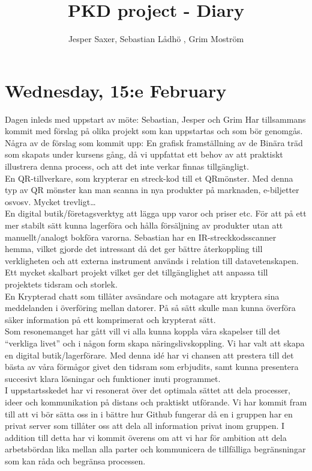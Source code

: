 \documentclass[11pt]{article}
\begin{document}
\title{PKD project - Diary}
\author{Jesper Saxer, Sebastian Lådhö , Grim Moström}
\date{}
\maketitle
\section*{Wednesday, 15:e February}
Dagen inleds med uppstart av möte: Sebastian, Jesper och Grim Har tillsammans kommit med förslag på olika projekt som kan uppstartas och som bör genomgås.
Några av de förslag som kommit upp:
En grafisk framställning av de Binära träd som skapats under kursens gång, då vi uppfattat ett behov av att praktiskt illustrera denna process, och att det inte verkar finnas tillgängligt.\\

En QR-tillverkare, som krypterar en streck-kod till et QRmönster. Med denna typ av QR mönster kan man scanna in nya produkter på marknaden, e-biljetter osvosv. Mycket trevligt…\\

En digital butik/företagsverktyg att lägga upp varor och priser etc. För att på ett mer stabilt sätt kunna lagerföra och hålla försäljning av produkter utan att manuellt/analogt bokföra varorna. Sebastian har en IR-streckkodsscanner hemma, vilket gjorde det intressant då det ger bättre återkoppling till verkligheten och att externa instrument används i relation till datavetenskapen. Ett mycket skalbart projekt vilket ger det tillgänglighet att anpassa till projektets tidsram och storlek.\\

En Krypterad chatt som tillåter avsändare och motagare att kryptera sina meddelanden i överföring mellan datorer. På så sätt skulle man kunna överföra säker information på ett komprimerat och krypterat sätt.\\

Som resonemanget har gått vill vi alla kunna koppla våra skapelser till det “verkliga livet” och i någon form skapa näringslivskoppling. Vi har valt att skapa en digital butik/lagerförare. Med denna idé har vi chansen att prestera till det bästa av våra förmågor givet den tidsram som erbjudits, samt kunna presentera succesivt klara lösningar och funktioner inuti programmet.\\

I uppstartsskedet har vi resonerat över det optimala sättet att dela processer, ideer och kommunikation på distans och praktiskt utförande. Vi har kommit fram till att vi bör sätta oss in i bättre hur Github fungerar då en i gruppen har en privat server som tillåter oss att dela all information privat inom gruppen. I addition till detta har vi kommit överens om att vi har för ambition att dela arbetsbördan lika mellan alla parter och kommunicera de tillfälliga begränsningar som kan råda och begränsa processen.\\
\end{document}
